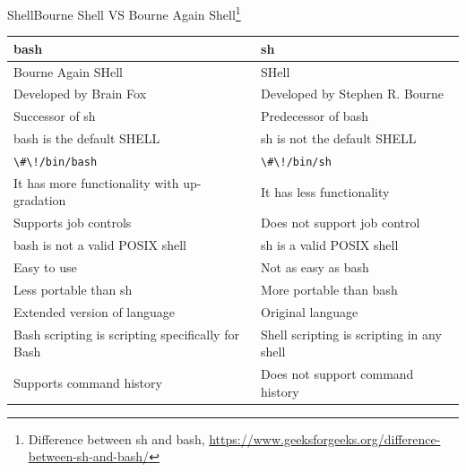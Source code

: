 \documentclass{beamer}
\begin{document}
    \begin{frame}{Shell}{Bourne Shell VS Bourne Again Shell\footnote{Difference between sh and bash, \url{https://www.geeksforgeeks.org/difference-between-sh-and-bash/}}}
        \begin{footnotesize}
            \begin{table}[h!]
                \centering
                \begin{tabular}{|p{5.5cm}|p{5.5cm}|}
                    \hline
                    \textbf{bash}                                     & \textbf{sh}                               \\ \hline
                    Bourne Again SHell                                & SHell                                     \\ \hline
                    Developed by Brain Fox                            & Developed by Stephen R. Bourne            \\ \hline
                    Successor of sh                                   & Predecessor of bash                       \\ \hline
                    bash is the default SHELL                         & sh is not the default SHELL               \\ \hline
                    \lstinline{\#\!/bin/bash}                         & \lstinline{\#\!/bin/sh}                   \\ \hline
                    It has more functionality with up-gradation       & It has less functionality                 \\ \hline
                    Supports job controls                             & Does not support job control              \\ \hline
                    bash is not a valid POSIX shell                   & sh is a valid POSIX shell                 \\ \hline
                    Easy to use                                       & Not as easy as bash                       \\ \hline
                    Less portable than sh                             & More portable than bash                   \\ \hline
                    Extended version of language                      & Original language                         \\ \hline
                    Bash scripting is scripting specifically for Bash & Shell scripting is scripting in any shell \\ \hline
                    Supports command history                          & Does not support command history          \\ \hline
                \end{tabular}
            \end{table}
        \end{footnotesize}
    \end{frame}
\end{document}
